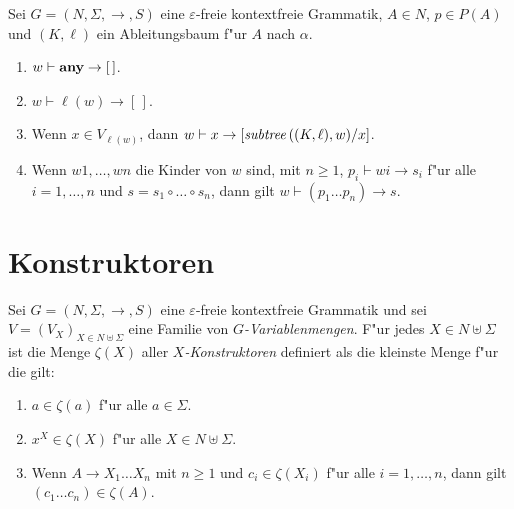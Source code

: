 \documentclass[12pt,a4paper]{article}
\begin{document}
\begin{definition}[Patternmatching]
  Sei $G = (N,\Sigma,\to,S)$ eine $\varepsilon$-freie kontextfreie Grammatik,
  $A \in N$, $p \in P(A)$ und $(K,\ell)$ ein Ableitungsbaum f"ur $A$ nach $\alpha$. 
  \begin{enumerate}
  \item $w \vdash \mathbf{any} \to [\,]$.
  \item $w \vdash \ell(w) \to [\,]$.
  \item Wenn $x \in V_{\ell(w)}$, dann $w \vdash x \to [\mathit{subtree}\,((K,\ell),w)/x]$.
  \item Wenn $w1,\ldots,wn$ die Kinder von $w$ sind, mit $n \ge 1$, $p_i \vdash wi \to s_i$ f"ur alle
    $i=1,\ldots,n$ und $s = s_1 \circ \ldots \circ s_n$, dann gilt $w \vdash (p_1 \ldots p_n) \to s$.
  \end{enumerate}
\end{definition}


\section{Konstruktoren}

\begin{definition}[Konstruktoren]
  Sei $G = (N,\Sigma,\to,S)$ eine $\varepsilon$-freie kontextfreie Grammatik und sei
  $V = (V_X)_{X \in N \uplus \Sigma}$ eine Familie von \emph{$G$-Variablenmengen}. F"ur
  jedes $X \in N \uplus \Sigma$ ist die Menge $\zeta(X)$ aller \emph{$X$-Konstruktoren}
  definiert als die kleinste Menge f"ur die gilt:
  \begin{enumerate}
  \item $a \in \zeta(a)$ f"ur alle $a \in \Sigma$.
  \item $x^X \in \zeta(X)$ f"ur alle $X \in N \uplus \Sigma$.
  \item Wenn $A \to X_1 \ldots X_n$ mit $n \ge 1$ und $c_i \in \zeta(X_i)$ f"ur alle
    $i=1,\ldots,n$, dann gilt $(c_1 \ldots c_n) \in \zeta(A)$.
  \end{enumerate}
\end{definition}
\end{document}
